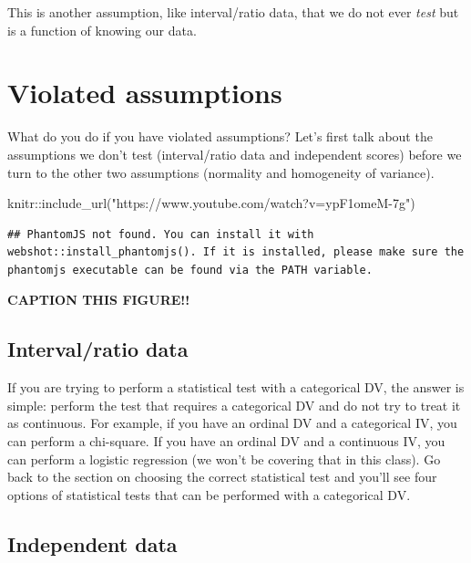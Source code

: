 \documentclass[
]{book}
\newenvironment{Shaded}{\begin{snugshade}}{\end{snugshade}}
\newcommand{\FunctionTok}[1]{\textcolor[rgb]{0.00,0.00,0.00}{#1}}
\newcommand{\NormalTok}[1]{#1}
\newcommand{\SpecialCharTok}[1]{\textcolor[rgb]{0.00,0.00,0.00}{#1}}
\newcommand{\StringTok}[1]{\textcolor[rgb]{0.31,0.60,0.02}{#1}}
\begin{document}
This is another assumption, like interval/ratio data, that we do not ever \emph{test} but is a function of knowing our data.

\hypertarget{violated-assumptions}{%
\section{Violated assumptions}\label{violated-assumptions}}

What do you do if you have violated assumptions? Let's first talk about the assumptions we don't test (interval/ratio data and independent scores) before we turn to the other two assumptions (normality and homogeneity of variance).

\begin{Shaded}
\begin{Highlighting}[]
\NormalTok{knitr}\SpecialCharTok{::}\FunctionTok{include\_url}\NormalTok{(}\StringTok{"https://www.youtube.com/watch?v=ypF1omeM{-}7g"}\NormalTok{)}
\end{Highlighting}
\end{Shaded}

\begin{verbatim}
## PhantomJS not found. You can install it with webshot::install_phantomjs(). If it is installed, please make sure the phantomjs executable can be found via the PATH variable.
\end{verbatim}

\label{fig:unnamed-chunk-1}\textbf{CAPTION THIS FIGURE!!}

\hypertarget{intervalratio-data-1}{%
\subsection{Interval/ratio data}\label{intervalratio-data-1}}

If you are trying to perform a statistical test with a categorical DV, the answer is simple: perform the test that requires a categorical DV and do not try to treat it as continuous. For example, if you have an ordinal DV and a categorical IV, you can perform a chi-square. If you have an ordinal DV and a continuous IV, you can perform a logistic regression (we won't be covering that in this class). Go back to the section on choosing the correct statistical test and you'll see four options of statistical tests that can be performed with a categorical DV.

\hypertarget{independent-data}{%
\subsection{Independent data}\label{independent-data}}
\end{document}
